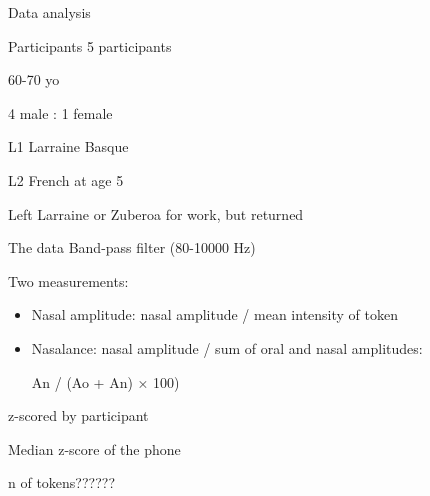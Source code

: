 \documentclass[
  ignorenonframetext,
]{beamer}
\begin{document}
\begin{frame}{Data analysis}
\protect\hypertarget{data-analysis}{}
\begin{block}{Participants}
\protect\hypertarget{participants}{}
5 participants

60-70 yo

4 male : 1 female

L1 Larraine Basque

L2 French at age 5

Left Larraine or Zuberoa for work, but returned
\end{block}

\begin{block}{The data}
\protect\hypertarget{the-data}{}
Band-pass filter (80-10000 Hz)

Two measurements:

\begin{itemize}
\item
  Nasal amplitude: nasal amplitude / mean intensity of token
\item
  Nasalance: nasal amplitude / sum of oral and nasal amplitudes:

  An / (Ao + An) × 100)
\end{itemize}

z-scored by participant

Median z-score of the phone

n of tokens??????
\end{block}
\end{frame}
\end{document}

